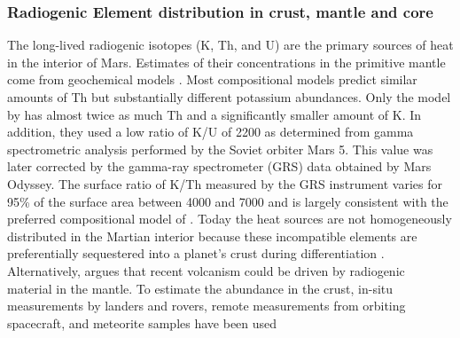 \subsubsection{Radiogenic Element distribution in crust, mantle and core}
The long-lived radiogenic isotopes (K, Th, and U) are the primary sources of heat in the interior of Mars. Estimates of their concentrations in the primitive mantle come from geochemical models \citep[][see also section 2.2]{Dreibus1984, Wanke1994, Treiman1986, Morgan1979, Lodders1997}. Most compositional models predict similar amounts of Th but substantially different potassium abundances. Only the model by \citet{Morgan1979} has almost twice as much Th and a significantly smaller amount of K. In addition, they used a low ratio of K/U of 2200 as determined from gamma spectrometric analysis performed by the Soviet orbiter Mars 5. This value was later corrected by the gamma-ray spectrometer (GRS) data obtained by Mars Odyssey. The surface ratio of K/Th measured by the GRS instrument varies for 95\% of the surface area between 4000 and 7000 \citep{Taylor2007} and is largely consistent with the preferred compositional model of \citet{Wanke1994}.  Today the heat sources are not homogeneously distributed in the Martian interior because these incompatible elements are preferentially sequestered into a planet's crust during differentiation \citep{Taylor2008}. Alternatively, \citet{Kiefer2003} argues that recent volcanism could be driven by radiogenic material in the mantle. To estimate the abundance in the crust, in-situ measurements by landers and rovers, remote measurements from orbiting spacecraft, and meteorite samples have been used \citep[e.g.,][]{Taylor2007}
